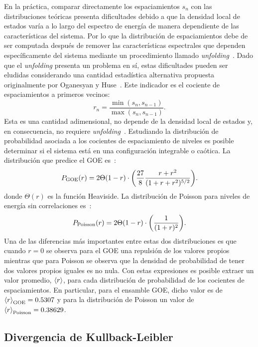 \documentclass[10pt,a4paper]{article}
\begin{document}
En la práctica, comparar directamente los espaciamientos $s_n$ con las distribuciones teóricas presenta dificultades debido a que
la densidad local de estados varía a lo largo del espectro de energía de manera dependiente de las características del sistema. Por lo que la distribución de espaciamientos debe de ser computada después de remover las características espectrales que dependen específicamente del sistema mediante un procedimiento llamado \textit{unfolding}~\cite{tekur2018higher}. Dado que el \textit{unfolding} presenta un problema en sí, estas dificultades pueden ser eludidas considerando una cantidad estadística alternativa propuesta originalmente por Oganesyan y Huse~\cite{oganesyan2007localization}. Este indicador es el cociente de espaciamientos a primeros vecinos:
\begin{equation}\label{eq:r}
  r_n=\frac{\min(s_n,s_{n-1})}{\max(s_n,s_{n-1})}.
\end{equation}
Esta es una cantidad adimensional, no depende de la densidad local de estados y, en consecuencia, no requiere \textit{unfolding}~\cite{tekur2018higher,oganesyan2007localization}. Estudiando la distribución de probabilidad asociada a los cocientes de espaciamiento de niveles es posible determinar si el sistema está en una configuración integrable 
o caótica. La distribución que predice el GOE es~\cite{Atas_2013}:
\begin{equation}
    \label{eq:goe}
 P_{\text{GOE}}(r)=2\Theta(1-r)\cdot \qty(\frac{27}{8}\frac{r+r^{2}}{(1+r+r^{2})^{5/2}}).
\end{equation}
donde $\Theta(r)$ es la función Heaviside.
La distribución de Poisson para niveles de energía sin correlaciones es~\cite{Atas_2013}:
\begin{equation}
    \label{eq:poi}
    P_{\text{Poisson}}(r)=2\Theta(1-r)\cdot\qty(\frac{1}{(1+r)^{2}}).
\end{equation}
Una de las diferencias más importantes entre estas dos distribuciones es que cuando $r=0$ se observa para el GOE una repulsión de los valores propios mientras que para Poisson se observa que la densidad de probabilidad de tener dos valores propios iguales es no nula. Con estas expresiones es posible extraer un valor promedio, $\ev{r}$, para cada distribución de probabilidad de los cocientes de espaciamientos. En particular, para el ensamble GOE, dicho valor es de $\ev{r}_{\text{GOE}}=0.5307\label{eq:rGOE}$ 
y para la distribución de Poisson un valor de $\ev{r}_{\text{\text{Poisson}}}=0.38629\label{eq:rPoi}$.

\subsection{Divergencia de Kullback-Leibler}\label{sec:kl_divergence}
\end{document}

